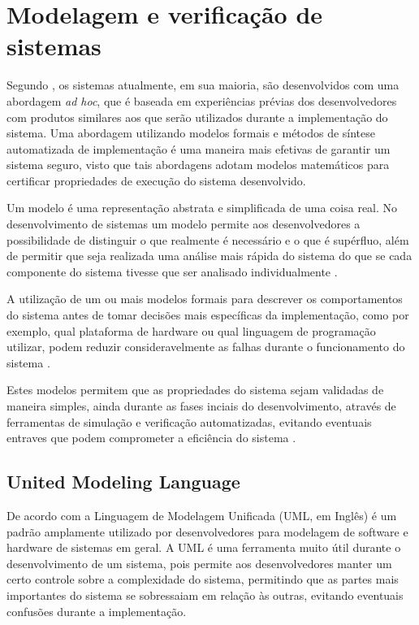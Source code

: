 

\section{Modelagem e verificação de sistemas}

Segundo , os sistemas atualmente, em sua maioria, são desenvolvidos com uma abordagem \textit{ad hoc}, que é baseada em experiências prévias dos desenvolvedores com produtos similares aos que serão utilizados durante a implementação do sistema. Uma abordagem utilizando modelos formais e métodos de síntese automatizada de implementação é uma maneira mais efetivas de garantir um sistema seguro, visto que tais abordagens adotam modelos matemáticos para certificar propriedades de execução do sistema desenvolvido. 

Um modelo é uma representação abstrata e simplificada de uma coisa real. No desenvolvimento de sistemas um modelo permite aos desenvolvedores a possibilidade de distinguir o que realmente é necessário e o que é supérfluo, além de permitir que seja realizada uma análise mais rápida do sistema do que se cada componente do sistema tivesse que ser analisado individualmente \cite{UML:2006}.

A utilização de um ou mais modelos formais para descrever os comportamentos do sistema antes de tomar decisões mais específicas da implementação, como por exemplo, qual plataforma de hardware ou qual linguagem de programação utilizar, podem reduzir consideravelmente as falhas durante o funcionamento do sistema \cite{edwards:1997}.

Estes modelos permitem que as propriedades do sistema sejam validadas de maneira simples, ainda durante as fases inciais do desenvolvimento, através de ferramentas de simulação e verificação automatizadas, evitando eventuais entraves que podem comprometer a eficiência do sistema \cite{edwards:1997}.

\subsection{United Modeling Language}

De acordo com  a Linguagem de Modelagem Unificada (UML, em Inglês) é um padrão amplamente utilizado por desenvolvedores para modelagem de software e hardware de sistemas em geral. A UML é uma ferramenta muito útil durante o desenvolvimento de um sistema, pois permite aos desenvolvedores manter um certo controle sobre a complexidade do sistema, permitindo que as partes mais importantes do sistema se sobressaiam em relação às outras, evitando eventuais confusões durante a implementação.

